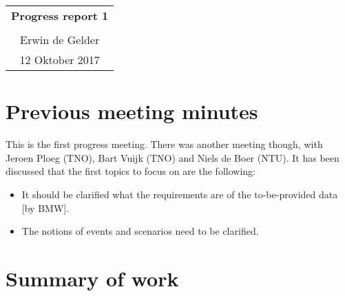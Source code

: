 \documentclass[10pt,final,a4paper,oneside,onecolumn]{article}
\newcommand{\progressreportnumber}{1}
\renewcommand{\author}{Erwin de Gelder}
\renewcommand{\date}{12 Oktober 2017}
\begin{document}
	
\begin{center}
	\begin{tabular}{c}
		\textbf{\huge Progress report \progressreportnumber} \\ \\
		\author \\ 
		\date
	\end{tabular}
\end{center}

\section*{Previous meeting minutes}

This is the first progress meeting. There was another meeting though, with Jeroen Ploeg (TNO), Bart Vuijk (TNO) and Niels de Boer (NTU). It has been discussed that the first topics to focus on are the following:
\begin{itemize}
	\item It should be clarified what the requirements are of the to-be-provided data [by BMW].
	\item The notions of events and scenarios need to be clarified.
\end{itemize}

\section*{Summary of work}
\end{document}

